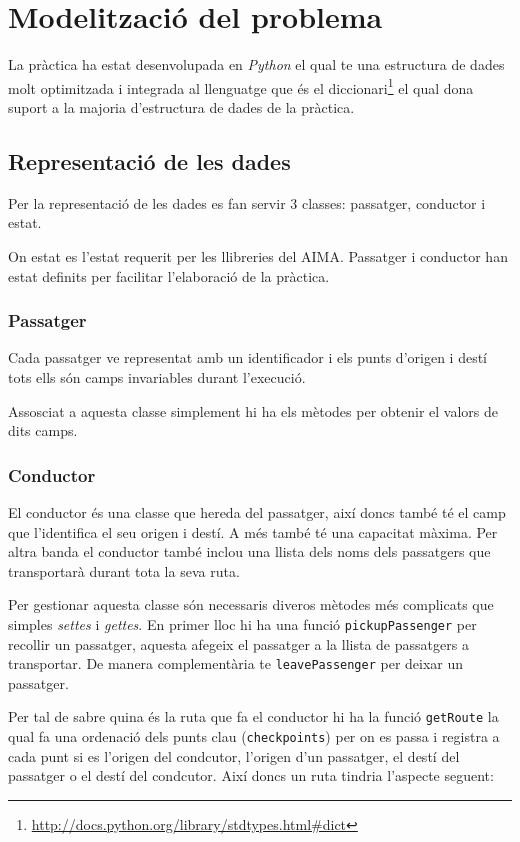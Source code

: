 \section{Modelització del problema}
La pràctica ha estat desenvolupada en \emph{Python} el qual te una estructura de dades molt optimitzada
i integrada al llenguatge que és el diccionari\footnote{\url{http://docs.python.org/library/stdtypes.html#dict}}
el qual dona suport a la majoria d'estructura de dades de la pràctica.

\subsection{Representació de les dades}
Per la representació de les dades es fan servir 3 classes: passatger, conductor i estat.

On estat es l'estat requerit per les llibreries del AIMA. Passatger i conductor han estat
definits per facilitar l'elaboració de la pràctica.

\subsubsection{Passatger}
Cada passatger ve representat amb un identificador i els punts d'origen i destí tots ells són
camps invariables durant l'execució.

Assosciat a aquesta classe simplement hi ha els mètodes per obtenir el valors de dits camps.

\subsubsection{Conductor}
El conductor és una classe que hereda del passatger, així doncs també té el camp que l'identifica
el seu origen i destí. A més també té una capacitat màxima.
Per altra banda el conductor també inclou una llista dels noms dels passatgers que transportarà
durant tota la seva ruta.

Per gestionar aquesta classe són necessaris diveros mètodes més complicats que simples \emph{settes} i \emph{gettes}.
En primer lloc hi ha una funció \texttt{pickupPassenger} per recollir un passatger, aquesta afegeix el passatger
a la llista de passatgers a transportar. De manera complementària te \texttt{leavePassenger} per deixar un 
passatger.

Per tal de sabre quina és la ruta que fa el conductor hi ha la funció \texttt{getRoute} la qual
fa una ordenació dels punts clau (\texttt{checkpoints}) per on es passa i registra a cada punt si es
l'origen del condcutor, l'origen d'un passatger, el destí del passatger o el destí del condcutor. Així
doncs un ruta tindria l'aspecte seguent: 


